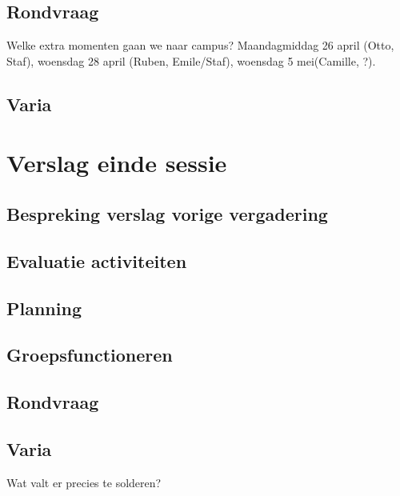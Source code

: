 \documentclass[a4paper,kulak]{kulakarticle} %
\begin{document}
\subsection{Rondvraag}
Welke extra momenten gaan we naar campus? Maandagmiddag 26 april (Otto, Staf), woensdag 28 april (Ruben, Emile/Staf), woensdag 5 mei(Camille, ?).

\subsection{Varia}




\section{Verslag einde sessie}

\subsection{Bespreking verslag vorige vergadering}

\subsection{Evaluatie activiteiten}

\subsection{Planning}

\subsection{Groepsfunctioneren}

\subsection{Rondvraag}

\subsection{Varia}
Wat valt er precies te solderen?
\end{document}
